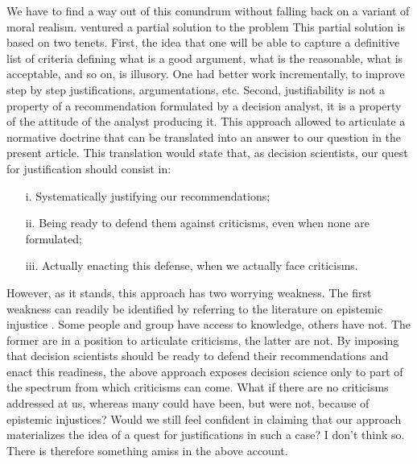 \documentclass[preprint,11pt]{elsarticle}
\begin{document}
We have to find a way out of this conundrum without falling back on a variant of moral realism. \cite{meinard_what_2017} ventured a partial solution to the problem  This partial solution is based on two tenets. First, the idea that one will be able to capture a definitive list of criteria defining what is a good argument, what is the reasonable, what is acceptable, and so on, is illusory. One had better work incrementally, to improve step by step justifications, argumentations, etc. Second, justifiability is not a property of a recommendation formulated by a decision analyst, it is a property of the attitude of the analyst producing it. This approach allowed to articulate a normative doctrine that can be translated into an answer to our question in the present article. This translation would state that, as decision scientists, our quest for justification should consist in:
\begin{itemize}
\item[i.]	Systematically justifying our recommendations;
\item[ii.]	Being ready to defend them against criticisms, even when none are formulated;
\item[iii.]	Actually enacting this defense, when we actually face criticisms.
\end{itemize}
However, as it stands, this approach has two worrying weakness.
The first weakness can readily be identified by referring to the literature on epistemic injustice \cite{fricker_epistemic_2007}. Some people and group have access to knowledge, others have not. The former are in a position to articulate criticisms, the latter are not. By imposing that decision scientists should be ready to defend their recommendations and enact this readiness, the above approach exposes decision science only to part of the spectrum from which criticisms can come. What if there are no criticisms addressed at us, whereas many could have been, but were not, because of epistemic injustices? Would we still feel confident in claiming that our approach materializes the idea of a quest for justifications in such a case? I don’t think so. There is therefore something amiss in the above account.
\end{document}
